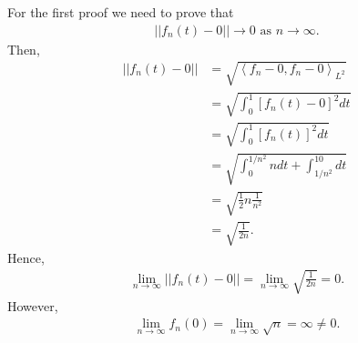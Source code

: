 \begin{questions}

\begin{solution}
For the first proof we need to prove that
\begin{align*}
||f_n(t)-0||\rightarrow 0\text{ as } n\rightarrow\infty.
\end{align*}
Then,
\begin{align*}
||f_n(t)-0||&=\sqrt{\left<f_n-0,f_n-0\right>_{L^2}}\\
&=\sqrt{\int_0^1\left[f_n(t)-0\right]^2dt}\\
&=\sqrt{\int_0^1\left[f_n(t)\right]^2dt}\\
&=\sqrt{\int_0^{1/n^2}ndt+\int_{1/n^2}^10dt}\\
&=\sqrt{\frac{1}{2}n\frac{1}{n^2}}\\
&=\sqrt{\frac{1}{2n}}.
\end{align*}
Hence,
\begin{align*}
\lim_{n\rightarrow\infty}||f_n(t)-0||=\lim_{n\rightarrow\infty}\sqrt{\frac{1}{2n}}=0.
\end{align*}
However,
\begin{align*}
\lim_{n\rightarrow\infty}f_n(0)=\lim_{n\rightarrow\infty}\sqrt{n}=\infty\neq 0.
\end{align*}
\end{solution}
\end{questions}
